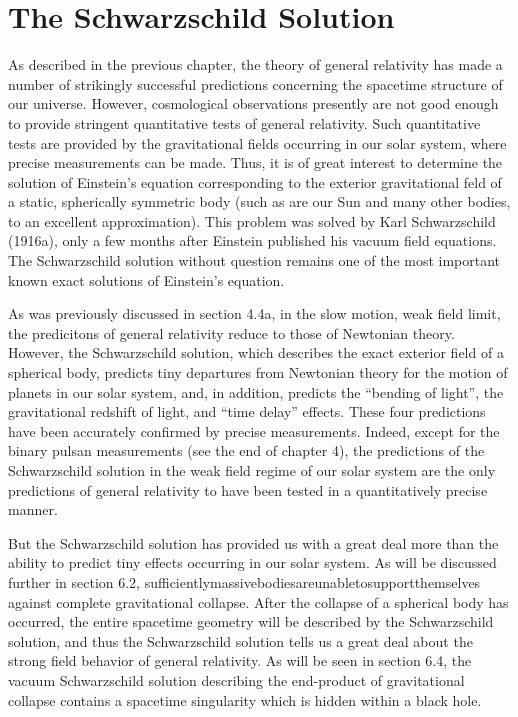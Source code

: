 \chapter{The Schwarzschild Solution}
As described in the previous chapter, the theory of general relativity has made a number of strikingly successful predictions concerning the spacetime structure of our universe. However, cosmological observations presently are not good enough to provide stringent quantitative tests of general relativity. Such quantitative tests are provided by the gravitational fields occurring in our solar system, where precise measurements can be made. Thus, it is of great interest to determine the solution of Einstein's equation corresponding to the exterior gravitational feld of a static, spherically symmetric body (such as are our Sun and many other bodies, to an excellent approximation). This problem was solved by Karl Schwarzschild (1916a), only a few months after Einstein published his vacuum field equations. The Schwarzschild solution without question remains one of the most important known exact solutions of Einstein's equation.

As was previously discussed in section 4.4a, in the slow motion, weak field limit, the predicitons of general relativity reduce to those of Newtonian theory. However, the Schwarzschild solution, which describes the exact exterior field of a spherical body, predicts tiny departures from Newtonian theory for the motion of planets in our solar system, and, in addition, predicts the ``bending of light'', the gravitational redshift of light, and ``time delay'' effects. These four predictions have been accurately confirmed by precise measurements. Indeed, except for the binary pulsan measurements (see the end of chapter 4), the predictions of the Schwarzschild solution in the weak field regime of our solar system are the only predictions of general relativity to have been tested in a quantitatively precise manner.

But the Schwarzschild solution has provided us with a great deal more than the ability to predict tiny effects occurring in our solar system. As will be discussed further in section 6.2, sufficientlymassivebodiesareunabletosupportthemselves against complete gravitational collapse. After the collapse of a spherical body has occurred, the entire spacetime geometry will be described by the Schwarzschild solution, and thus the Schwarzschild solution tells us a great deal about the strong field behavior of general relativity. As will be seen in section 6.4, the vacuum Schwarzschild solution describing the end-product of gravitational collapse contains a spacetime singularity which is hidden within a black hole.

